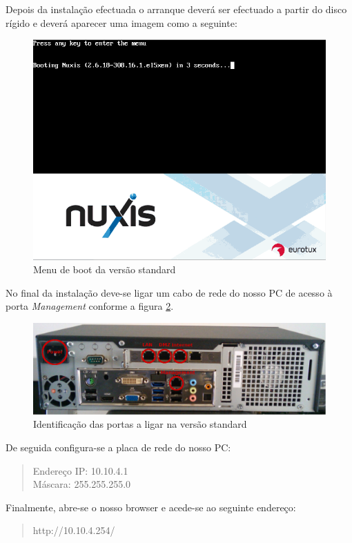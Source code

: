 Depois da instalação efectuada o arranque deverá ser efectuado a partir do disco rígido e deverá aparecer uma imagem como a seguinte:

\begin{figure}[H]
	\begin{center}
	\includegraphics[scale=0.5]{screenshots/install_etva11.png}
	\caption{Menu de boot da versão standard}
	\label{fig:boot_screen_standard}
	\end{center}
\end{figure}

No final da instalação deve-se ligar um cabo de rede do nosso PC de acesso à porta \emph{Management} conforme a figura \ref{fig:back_standard}.

\begin{figure}[H]
	\begin{center}
	\includegraphics[scale=0.30]{screenshots/appliance_back_g2.jpg}
	\caption{Identificação das portas a ligar na versão standard}
	\label{fig:back_standard}
	\end{center}
\end{figure}

De seguida configura-se a placa de rede do nosso PC:

\begin{quote}
Endereço IP: 10.10.4.1\\
Máscara: 255.255.255.0
\end{quote}

Finalmente, abre-se o nosso browser e acede-se ao seguinte endereço:
\begin{quote}
http://10.10.4.254/
\end{quote}

\pagebreak
